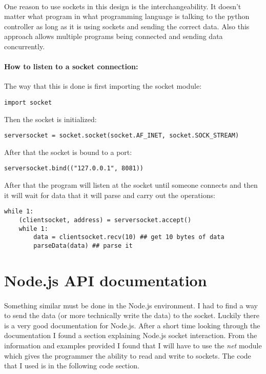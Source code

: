 \documentclass[12pt,a4paper]{report}
\begin{document}
\paragraph{}
One reason to use sockets in this design is the interchangeability. It doesn’t matter what program in what programming language is talking to the python controller as long as it is using sockets and sending the correct data. Also this approach allows multiple programs being connected and sending data concurrently.

\paragraph{How to listen to a socket connection:}
The way that this is done is first importing the socket module:

\begin{lstlisting}
import socket
\end{lstlisting}
Then the socket is initialized:
\begin{lstlisting}
serversocket = socket.socket(socket.AF_INET, socket.SOCK_STREAM)
\end{lstlisting}
After that the socket is bound to a port:
\begin{lstlisting}
serversocket.bind(("127.0.0.1", 8081))
\end{lstlisting}
After that the program will listen at the socket until someone connects and then it will wait for data that it will parse and carry out the operations:
\begin{lstlisting}
while 1:
	(clientsocket, address) = serversocket.accept()
	while 1:
		data = clientsocket.recv(10) ## get 10 bytes of data
		parseData(data) ## parse it
\end{lstlisting}


\section{Node.js API documentation }

\paragraph{}
Something similar must be done in the Node.js environment. I had to find a way to send the data (or more technically write the data) to the socket. Luckily there is a very good documentation for Node.js. After a short time looking through the documentation I found a section explaining Node.js socket interaction. From the information and examples provided I found that I will have to use the \textit{net} module which gives the programmer the ability to read and write to sockets. The code that I used is in the following code section.
\end{document}
